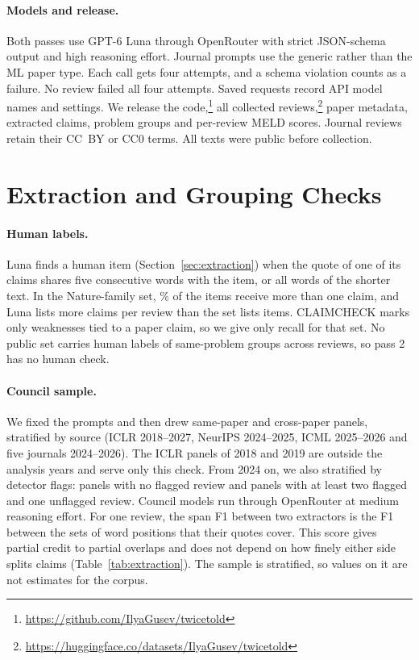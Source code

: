 \documentclass[11pt]{article}
\begin{document}
\paragraph{Models and release.}
Both passes use GPT-6 Luna through OpenRouter with strict JSON-schema output and high reasoning effort. Journal prompts use the generic rather than the ML paper type. Each call gets four attempts, and a schema violation counts as a failure. No review failed all four attempts. Saved requests record API model names and settings. We release the code,\footnote{\url{https://github.com/IlyaGusev/twicetold}} all collected reviews,\footnote{\url{https://huggingface.co/datasets/IlyaGusev/twicetold}} paper metadata, extracted claims, problem groups and per-review MELD scores. Journal reviews retain their CC~BY or CC0 terms. All texts were public before collection.


\section{Extraction and Grouping Checks}
\label{app:reference}

\paragraph{Human labels.} Luna finds a human item (Section~\ref{sec:extraction}) when the quote of one of its claims shares five consecutive words with the item, or all words of the shorter text. In the Nature-family set, \KimItemSplit\% of the items receive more than one claim, and Luna lists \KimClaimsBias{} more claims per review than the set lists items. CLAIMCHECK marks only weaknesses tied to a paper claim, so we give only recall for that set. No public set carries human labels of same-problem groups across reviews, so pass 2 has no human check.

\paragraph{Council sample.} We fixed the prompts and then drew \RefPanels{} same-paper and \RefCrossPanels{} cross-paper panels, stratified by source (ICLR 2018--2027, NeurIPS 2024--2025, ICML 2025--2026 and five journals 2024--2026). The ICLR panels of 2018 and 2019 are outside the analysis years and serve only this check. From 2024 on, we also stratified by detector flags: panels with no flagged review and panels with at least two flagged and one unflagged review. Council models run through OpenRouter at medium reasoning effort. For one review, the span F1 between two extractors is the F1 between the sets of word positions that their quotes cover. This score gives partial credit to partial overlaps and does not depend on how finely either side splits claims (Table~\ref{tab:extraction}). The sample is stratified, so values on it are not estimates for the corpus.
\end{document}
